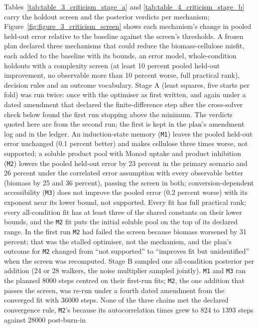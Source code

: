\documentclass[11pt,a4paper]{article}
\begin{document}
Tables~\ref{tab:table_3_criticism_stage_a} and
\ref{tab:table_4_criticism_stage_b} carry the holdout screen and the
posterior verdicts per mechanism; Figure~\ref{fig:figure_3_criticism_screen}
shows each mechanism's change in pooled held-out error relative to the
baseline against the screen's thresholds. A frozen plan declared three
mechanisms that could reduce the biomass-cellulose misfit, each added to
the baseline with its bounds, an error model, whole-condition holdouts with
a complexity screen (at least 10 percent pooled held-out improvement, no
observable more than 10 percent worse, full practical rank), decision rules
and an outcome vocabulary. Stage A (least squares, five starts per fold) was
run twice: once with the optimiser as first written, and again under a
dated amendment that declared the finite-difference step after the
cross-solver check below found the first run stopping above the minimum.
The verdicts quoted here are from the second run; the first is kept in the
plan's amendment log and in the ledger. An induction-state memory
(\texttt{M1}) leaves the pooled held-out error unchanged (0.1 percent
better) and makes cellulose three times worse, not supported; a soluble
product pool with Monod uptake and product inhibition (\texttt{M2}) lowers
the pooled held-out error by 23 percent in the primary scenario and 26
percent under the correlated error assumption with every observable better
(biomass by 25 and 36 percent), passing the screen in both;
conversion-dependent accessibility \citep{kadam2004} (\texttt{M3}) does not
improve the pooled error (0.2 percent worse) with its exponent near its
lower bound, not supported. Every fit has full practical rank; every
all-condition fit has at least three of the shared constants on their lower
bounds, and the \texttt{M2} fit puts the initial soluble pool on the top of
its declared range. In the first run \texttt{M2} had failed the screen
because biomass worsened by 31 percent; that was the stalled optimiser, not
the mechanism, and the plan's outcome for \texttt{M2} changed from ``not
supported'' to ``improves fit but unidentified'' when the screen was
recomputed. Stage B sampled one all-condition posterior per addition (24
or 28 walkers, the noise multiplier sampled jointly). \texttt{M1} and
\texttt{M3} ran the planned 8000 steps centred on their first-run fits;
\texttt{M2}, the one addition that passes the screen, was re-run under a
fourth dated amendment from the converged fit with 36000 steps. None of the
three chains met the declared convergence rule, \texttt{M2}'s because its
autocorrelation times grew to 824 to 1393 steps against 28000 post-burn-in
\end{document}
